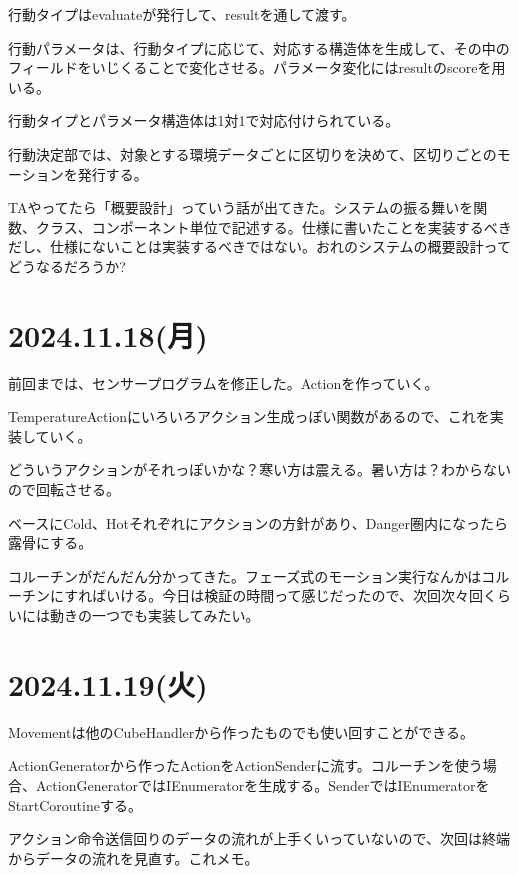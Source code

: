 \documentclass[fleqn,twocolumn]{mynote}
\begin{document}
  行動タイプはevaluateが発行して、resultを通して渡す。

  行動パラメータは、行動タイプに応じて、対応する構造体を生成して、その中のフィールドをいじくることで変化させる。パラメータ変化にはresultのscoreを用いる。

  行動タイプとパラメータ構造体は1対1で対応付けられている。

  行動決定部では、対象とする環境データごとに区切りを決めて、区切りごとのモーションを発行する。

  TAやってたら「概要設計」っていう話が出てきた。システムの振る舞いを関数、クラス、コンポーネント単位で記述する。仕様に書いたことを実装するべきだし、仕様にないことは実装するべきではない。おれのシステムの概要設計ってどうなるだろうか?

  \section*{2024.11.18(月)}
  前回までは、センサープログラムを修正した。Actionを作っていく。

  TemperatureActionにいろいろアクション生成っぽい関数があるので、これを実装していく。

  どういうアクションがそれっぽいかな？寒い方は震える。暑い方は？わからないので回転させる。

  ベースにCold、Hotそれぞれにアクションの方針があり、Danger圏内になったら露骨にする。

  コルーチンがだんだん分かってきた。フェーズ式のモーション実行なんかはコルーチンにすればいける。今日は検証の時間って感じだったので、次回次々回くらいには動きの一つでも実装してみたい。

  \section*{2024.11.19(火)}
  Movementは他のCubeHandlerから作ったものでも使い回すことができる。

  ActionGeneratorから作ったActionをActionSenderに流す。コルーチンを使う場合、ActionGeneratorではIEnumeratorを生成する。SenderではIEnumeratorをStartCoroutineする。

  アクション命令送信回りのデータの流れが上手くいっていないので、次回は終端からデータの流れを見直す。これメモ。

  \fboxsep=0pt            %
  \fboxrule=1pt            %
  \begin{figure}[h]
    \centering
    \caption{}
    \label{fig:}
  \end{figure}
\end{document}
